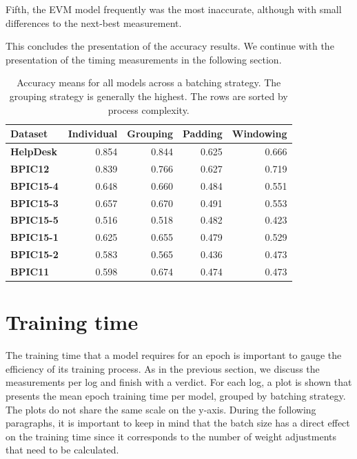 Fifth, the EVM model frequently was the most inaccurate, although with small differences to the next-best measurement.

This concludes the presentation of the accuracy results.
We continue with the presentation of the timing measurements in the following section.

\begin{table}
\centering
\begin{tabular}{lrrrr}
\textbf{Dataset}  &  \textbf{Individual} &  \textbf{Grouping} &   \textbf{Padding} &  \textbf{Windowing}\\
\midrule
\textbf{HelpDesk} &       0.854 &    0.844 &   0.625 &     0.666 \\
\textbf{BPIC12  } &       0.839 &    0.766 &   0.627 &     0.719 \\
\textbf{BPIC15-4} &       0.648 &    0.660 &   0.484 &     0.551 \\
\textbf{BPIC15-3} &       0.657 &    0.670 &   0.491 &     0.553 \\
\textbf{BPIC15-5} &       0.516 &    0.518 &   0.482 &     0.423 \\
\textbf{BPIC15-1} &       0.625 &    0.655 &   0.479 &     0.529 \\
\textbf{BPIC15-2} &       0.583 &    0.565 &   0.436 &     0.473 \\
\textbf{BPIC11  } &       0.598 &    0.674 &   0.474 &     0.473 \\
\end{tabular}
\caption[Mean accuracies per batching strategy]{Accuracy means for all models across a batching strategy. The grouping strategy is generally the highest. The rows are sorted by process complexity.}
\label{tab:strategy-top-accuracies}
\end{table}


\section{Training time}\label{sec:eval:training-time}
The training time that a model requires for an epoch is important to gauge the efficiency of its training process.
As in the previous section, we discuss the measurements per log and finish with a verdict.
For each log, a plot is shown that presents the mean epoch training time per model, grouped by batching strategy.
The plots do not share the same scale on the y-axis.
During the following paragraphs, it is important to keep in mind that the batch size has a direct effect on the training time since it corresponds to the number of weight adjustments that need to be calculated.

